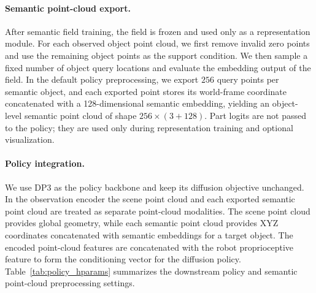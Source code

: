 \paragraph{Semantic point-cloud export.}
After semantic field training, the field is frozen and used only as a representation module. For each observed object point cloud, we first remove invalid zero points and use the remaining object points as the support condition. We then sample a fixed number of object query locations and evaluate the embedding output of the field. In the default policy preprocessing, we export $256$ query points per semantic object, and each exported point stores its world-frame coordinate concatenated with a 128-dimensional semantic embedding, yielding an object-level semantic point cloud of shape $256\times(3+128)$. Part logits are not passed to the policy; they are used only during representation training and optional visualization.

\paragraph{Policy integration.}
We use DP3 as the policy backbone and keep its diffusion objective unchanged. In the observation encoder the scene point cloud and each exported semantic point cloud are treated as separate point-cloud modalities. The scene point cloud provides global geometry, while each semantic point cloud provides XYZ coordinates
concatenated with semantic embeddings for a target object. The encoded point-cloud features are concatenated with the robot proprioceptive feature to form the conditioning vector for the diffusion policy. Table~\ref{tab:policy_hparams} summarizes the downstream policy and semantic point-cloud preprocessing settings.



